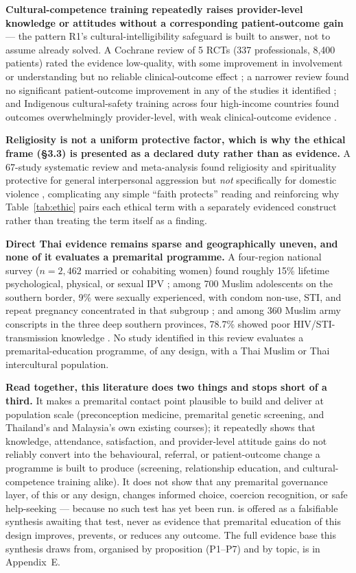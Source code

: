 \textbf{Cultural-competence training repeatedly raises provider-level knowledge or attitudes without
a corresponding patient-outcome gain} --- the pattern R1's cultural-intelligibility safeguard is
built to answer, not to assume already solved. A Cochrane review of 5 RCTs (337 professionals,
8{,}400 patients) rated the evidence low-quality, with some improvement in involvement or
understanding but no reliable clinical-outcome effect \cite{ref55}; a narrower review found no
significant patient-outcome improvement in any of the studies it identified \cite{ref56}; and
Indigenous cultural-safety training across four high-income countries found outcomes overwhelmingly
provider-level, with weak clinical-outcome evidence \cite{ref57}.

\textbf{Religiosity is not a uniform protective factor, which is why the ethical frame (\S3.3) is
presented as a declared duty rather than as evidence.} A 67-study systematic review and
meta-analysis found religiosity and spirituality protective for general interpersonal aggression but
\emph{not} specifically for domestic violence \cite{ref220}, complicating any simple ``faith
protects'' reading and reinforcing why Table~\ref{tab:ethic} pairs each ethical term with a
separately evidenced construct rather than treating the term itself as a finding.

\textbf{Direct Thai evidence remains sparse and geographically uneven, and none of it evaluates a
premarital programme.} A four-region national survey ($n=2{,}462$ married or cohabiting women) found
roughly 15\% lifetime psychological, physical, or sexual IPV \cite{ref72}; among 700 Muslim
adolescents on the southern border, 9\% were sexually experienced, with condom non-use, STI, and
repeat pregnancy concentrated in that subgroup \cite{ref76}; and among 360 Muslim army conscripts in
the three deep southern provinces, 78.7\% showed poor HIV/STI-transmission knowledge \cite{ref77}.
No study identified in this review evaluates a premarital-education programme, of any design, with a
Thai Muslim or Thai intercultural population.

\textbf{Read together, this literature does two things and stops short of a third.} It makes a
premarital contact point plausible to build and deliver at population scale (preconception medicine,
premarital genetic screening, and Thailand's and Malaysia's own existing courses); it repeatedly
shows that knowledge, attendance, satisfaction, and provider-level attitude gains do not reliably
convert into the behavioural, referral, or patient-outcome change a programme is built to produce
(screening, relationship education, and cultural-competence training alike). It does not show that
any premarital governance layer, of this or any design, changes informed choice, coercion
recognition, or safe help-seeking --- because no such test has yet been run. \tphe{} is offered as a
falsifiable synthesis awaiting that test, never as evidence that premarital education of this design
improves, prevents, or reduces any outcome. The full evidence base this synthesis draws from,
organised by proposition (P1--P7) and by topic, is in Appendix~E.
